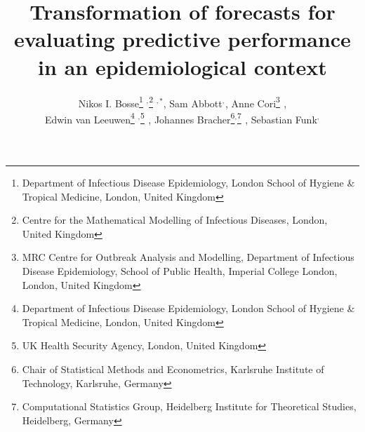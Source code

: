 \documentclass{article}
\begin{document}
\title{Transformation of forecasts for evaluating predictive performance in an epidemiological context}
  \author{Nikos I. Bosse\thanks{Department of Infectious Disease Epidemiology, London School of Hygiene \& Tropical Medicine, London, United Kingdom} $^{,}$\thanks{Centre for the Mathematical Modelling of Infectious Diseases, London, United Kingdom} $^{,*}$, 
  Sam Abbott\footnotemark[1] $^{,}$\footnotemark[2]$ ^{}$, 
  Anne Cori\thanks{MRC Centre for Outbreak Analysis and Modelling, Department of Infectious Disease Epidemiology, School of Public Health, Imperial College London, London, United Kingdom} $^{}$, \\
  Edwin van Leeuwen\thanks{Department of Infectious Disease Epidemiology, London School of Hygiene \& Tropical Medicine, London, United Kingdom} $^{,}$\thanks{UK Health Security Agency, London, United Kingdom} $^{}$, 
  Johannes Bracher\thanks{Chair of Statistical Methods and Econometrics, Karlsruhe Institute of Technology, Karlsruhe, Germany}$^{,}$\thanks{Computational Statistics Group, Heidelberg Institute for Theoretical Studies, Heidelberg, Germany} $^{}$, 
  Sebastian Funk\footnotemark[1] $^{,}$\footnotemark[2]$ ^{}$}
\end{document}
